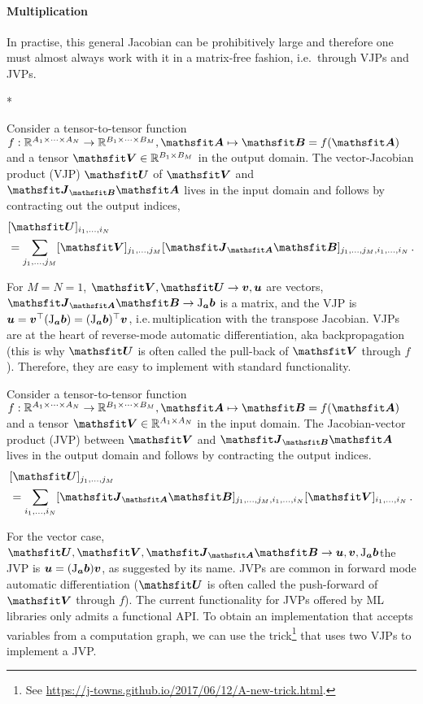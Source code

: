 \paragraph{Multiplication} In practise, this general Jacobian can be prohibitively large and therefore one must almost always work with it in a matrix-free fashion, i.e.\, through VJPs and JVPs.

\switchcolumn[1]*
\switchcolumn[0]

\begin{definition}\label{def:vjp}
  Consider a tensor-to-tensor function $f: \sR^{A_1 \times \dots \times A_N} \to \sR^{B_1 \times \dots \times B_M}, \tA \mapsto \tB = f(\tA)$ and a tensor $\tV \in \sR^{B_1 \times B_M}$ in the output domain. The vector-Jacobian product (VJP) $\tU$ of $\tV$ and $\tJ_{\tB}\tA$ lives in the input domain and follows by contracting out the output indices,
  \begin{align*}
    &[\tU]_{i_1, \dots, i_N}
    \\
    &=
      \sum_{j_1, \dots, j_M}
      [\tV]_{j_1, \dots, j_M}
      [\tJ_{\tA}\tB]_{j_1, \dots, j_M, i_1, \dots, i_N}\,.
  \end{align*}
\end{definition}
For $M=N=1$, $\tV, \tU \to \vv, \vu$ are vectors, $\tJ_{\tA}\tB \to \jac_{\va}\vb$ is a matrix, and the VJP is ${\bm{u}} = {\bm{v}}^{\top} (\mathrm{J}_{{\bm{a}}}{\bm{b}}) = (\mathrm{J}_{{\bm{a}}}{\bm{b}})^{\top} {\bm{v}}$, i.e.\,multiplication with the transpose Jacobian.
VJPs are at the heart of reverse-mode automatic differentiation, aka backpropagation (this is why $\tU$ is often called the pull-back of $\tV$ through $f$).
Therefore, they are easy to implement with standard functionality.

\begin{definition}\label{def:jvp}
  Consider a tensor-to-tensor function $f: \sR^{A_1 \times \dots \times A_N} \to \sR^{B_1 \times \dots \times B_M}, \tA \mapsto \tB = f(\tA)$ and a tensor $\tV \in \sR^{A_1 \times A_N}$ in the input domain. The Jacobian-vector product (JVP) between $\tV$ and $\tJ_{\tB}\tA$ lives in the output domain and follows by contracting the output indices.
  \begin{align*}
    &[\tU]_{j_1, \dots, j_M}
    \\
    &=
      \sum_{i_1, \dots, i_N}
      [\tJ_{\tA}\tB]_{j_1, \dots, j_M, i_1, \dots, i_N}
      [\tV]_{i_1, \dots, i_N}\,.
  \end{align*}
\end{definition}
For the vector case, $\tU, \tV, \tJ_{\tA}\tB \to \vu, \vv, \jac_{\va}\vb$the JVP is ${\bm{u}} = (\mathrm{J}_{{\bm{a}}}{\bm{b}}) {\bm{v}}$, as suggested by its name.
JVPs are common in forward mode automatic differentiation ($\tU$ is often called the push-forward of $\tV$ through $f$).
The current functionality for JVPs offered by ML libraries only admits a functional API.
To obtain an implementation that accepts variables from a computation graph, we can use the trick\footnote{See \url{https://j-towns.github.io/2017/06/12/A-new-trick.html}.} that uses two VJPs to implement a JVP.

